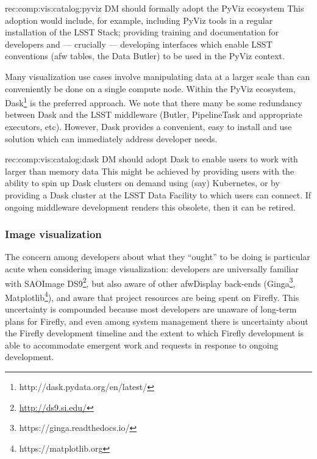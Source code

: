 \begin{recommendation}
  {rec:comp:vis:catalog:pyviz}
  {DM should formally adopt the PyViz ecosystem}
This adoption would include, for example, including PyViz tools in a regular installation of the LSST Stack; providing training and documentation for developers and --- crucially --- developing interfaces which enable LSST conventions (afw tables, the Data Butler) to be used in the PyViz context.
\end{recommendation}

Many visualization use cases involve manipulating data at a larger scale than can conveniently be done on a single compute node.
Within the PyViz ecosystem, Dask\footnote{http://dask.pydata.org/en/latest/} is the preferred approach.
We note that there many be some redundancy between Dask and the LSST middleware (Butler, PipelineTask and appropriate executors, etc).
However, Dask provides a convenient, easy to install and use solution which can immediately address developer needs.

\begin{recommendation}
  {rec:comp:vis:catalog:dask}
  {DM should adopt Dask to enable users to work with larger than memory data}
This might be achieved by providing users with the ability to spin up Dask clusters on demand using (say) Kubernetes, or by providing a Dask cluster at the LSST Data Facility to which users can connect.
If ongoing middleware development renders this obsolete, then it can be retired.
\end{recommendation}

\subsubsection{Image visualization}
\label{sec:comp:vis:image}

The concern among developers about what they ``ought'' to be doing is particular acute when considering image visualization: developers are universally familiar with SAOImage DS9\footnote{\url{http://ds9.si.edu/}}, but also aware of other afwDisplay back-ends (Ginga\footnote{https://ginga.readthedocs.io/}, Matplotlib\footnote{https://matplotlib.org}), and aware that project resources are being spent on Firefly.
This uncertainty is compounded because most developers are unaware of long-term plans for Firefly, and even among system management there is uncertainty about the Firefly development timeline and the extent to which Firefly development is able to accommodate emergent work and requests in response to ongoing development.

